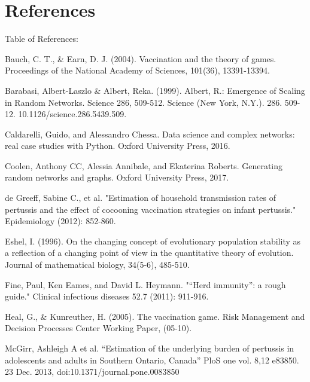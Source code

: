 \documentclass[11pt]{article}
\begin{document}
\section{References}
Table of References: 
\vspace{14px}

Bauch, C. T., \& Earn, D. J. (2004). Vaccination and the theory of games. Proceedings of the National Academy of Sciences, 101(36), 13391-13394.
\vspace{14px}

Barabasi, Albert-Laszlo \& Albert, Reka. (1999). Albert, R.: Emergence of Scaling in Random Networks. Science 286, 509-512. Science (New York, N.Y.). 286. 509-12. 10.1126/science.286.5439.509.
\vspace{14px}

Caldarelli, Guido, and Alessandro Chessa. Data science and complex networks: real case studies with Python. Oxford University Press, 2016.
\vspace{14px}

Coolen, Anthony CC, Alessia Annibale, and Ekaterina Roberts. Generating random networks and graphs. Oxford University Press, 2017.
\vspace{14px}

de Greeff, Sabine C., et al. "Estimation of household transmission rates of pertussis and the effect of cocooning vaccination strategies on infant pertussis." Epidemiology (2012): 852-860.
\vspace{14px}

Eshel, I. (1996). On the changing concept of evolutionary population stability as a reflection of a changing point of view in the quantitative theory of evolution. Journal of mathematical biology, 34(5-6), 485-510.
\vspace{14px}

Fine, Paul, Ken Eames, and David L. Heymann. "“Herd immunity”: a rough guide." Clinical infectious diseases 52.7 (2011): 911-916.
\vspace{14px}

Heal, G., \& Kunreuther, H. (2005). The vaccination game. Risk Management and Decision Processes Center Working Paper, (05-10). 
\vspace{14px}

McGirr, Ashleigh A et al. “Estimation of the underlying burden of pertussis in adolescents and adults in Southern Ontario, Canada” PloS one vol. 8,12 e83850. 23 Dec. 2013, doi:10.1371/journal.pone.0083850
\vspace{14px}
\end{document}
